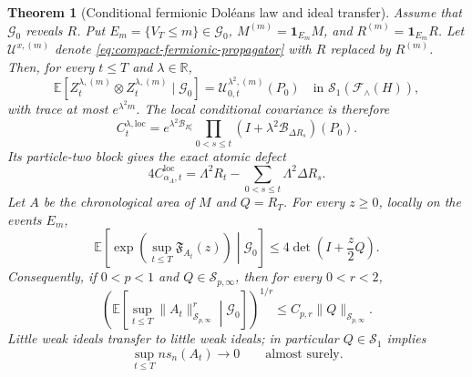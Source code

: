 \documentclass[10pt,reqno]{amsart}
\theoremstyle{plain}
\newtheorem{theorem}{Theorem}[section]
\theoremstyle{definition}
\theoremstyle{remark}
\begin{document}
\begin{theorem}[Conditional fermionic Dol\'eans law and ideal transfer]
\label{thm:compact-revealed-doleans}
Assume that $\mathcal G_0$ reveals $R$.  Put
$E_m=\{V_T\le m\}\in\mathcal G_0$,
$M^{(m)}=\mathbf1_{E_m}M$, and $R^{(m)}=\mathbf1_{E_m}R$.
Let $\mathscr U^{x,(m)}$ denote
\eqref{eq:compact-fermionic-propagator} with $R$ replaced by $R^{(m)}$.
Then, for every $t\le T$ and $\lambda\in\mathbb R$,
\begin{equation}
 \mathbb E\!\left[
 Z_t^{\lambda,(m)}\otimes Z_t^{\lambda,(m)}\mid\mathcal G_0\right]
 =\mathscr U_{0,t}^{\lambda^2,(m)}(P_0)
 \quad\text{in }\mathcal S_1(\mathcal F_\wedge(H)),
 \label{eq:compact-doleans}
\end{equation}
with trace at most $e^{\lambda^2m}$.  The local conditional covariance is
therefore
\begin{equation}
 C_t^{\lambda,\mathrm{loc}}
 =e^{\lambda^2\mathcal B_{R_t^c}}
  \prod_{0<s\le t}(I+\lambda^2\mathcal B_{\Delta R_s})(P_0).
 \label{eq:compact-local-covariance}
\end{equation}
Its particle-two block gives the exact atomic defect
\begin{equation}
 4C_{\alpha_A,t}^{\mathrm{loc}}
 =\Lambda^2R_t-\sum_{0<s\le t}\Lambda^2\Delta R_s.
 \label{eq:compact-atomic-defect}
\end{equation}
Let $A$ be the chronological area of $M$ and $Q=R_T$.  For every $z\ge0$,
locally on the events $E_m$,
\begin{equation}
 \mathbb E\!\left[
 \exp\!\left(\sup_{t\le T}\mathfrak F_{A_t}(z)\right)
 \middle|\mathcal G_0\right]
 \le4\det\!\left(I+\frac z2Q\right).
 \label{eq:compact-revealed-profile}
\end{equation}
Consequently, if $0<p<1$ and $Q\in\mathcal S_{p,\infty}$, then for every
$0<r<2$,
\[
 \left(\mathbb E\!\left[
  \sup_{t\le T}\|A_t\|_{\mathcal S_{p,\infty}}^r
  \middle|\mathcal G_0\right]\right)^{1/r}
 \le C_{p,r}\|Q\|_{\mathcal S_{p,\infty}}.
\]
Little weak ideals transfer to little weak ideals; in particular
$Q\in\mathcal S_1$ implies
\begin{equation}
 \sup_{t\le T}n s_n(A_t)\longrightarrow0
 \qquad\text{almost surely}.
 \label{eq:compact-trace-transfer}
\end{equation}
\end{theorem}
\end{document}
